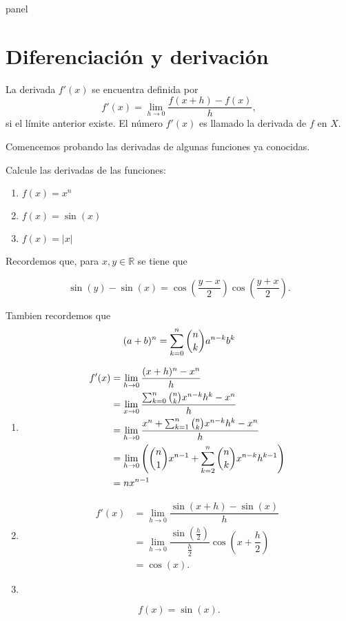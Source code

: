 panel\chapter*{Diferenciaci\'on y derivaci\'on}


\begin{definition}
	La derivada \(f'(x)\) se encuentra definida por
	\[
	f'(x)=\lim\limits_{h\to 0}\dfrac{f(x+h)-f(x)}{h},
	\]
	si el l\'imite anterior existe. El n\'umero \(f'(x)\) es llamado la derivada de \(f\) en \(X.\)
\end{definition}


Comencemos probando las derivadas de algunas funciones ya conocidas.\newline

\begin{exercise}
	Calcule las derivadas de las funciones:
	
	\begin{enumerate}
		\item \(f(x)=x^n\)
		\item \(f(x)=\sin(x)\)
		\item \(f(x)=\left|x\right|\)
	\end{enumerate}
\end{exercise}

Recordemos que, para \(x,y\in\mathbb{R}\) se tiene que

\[
\sin(y)-\sin(x)=\cos\left(\dfrac{y-x}{2}\right)\cos\left(\dfrac{y+x}{2}\right).
\]

Tambien recordemos que
\[
(a+b)^n=\displaystyle\sumabinomio{a}{b}{k}{n}\]

\begin{example}
	\begin{enumerate}
		\item \begin{align*}
		f'(x)&=\lim\limits_{h\to 0}\dfrac{(x+h)^n-x^n}{h}\\
			&=\lim\limits_{x\to 0}\dfrac{\sumabinomio{x}{h}{k}{n}-x^n}{h}\\
			&=\lim\limits_{h\to 0}\dfrac{x^n+\sum_{k=1}^{n}\binom{n}{k}x^{n-k}h^{k}-x^n}{h}\\
			&=\lim\limits_{h\to 0}\left(\binom{n}{1}x^{n-1}+\sum_{k=2}^{n}\binom{n}{k}x^{n-k}h^{k-1}	\right)\\
			&=nx^{n-1}
		\end{align*}
		
		
		\item \begin{align*}
		f'(x)&=\lim\limits_{h\to 0}\dfrac{\sin(x+h)-\sin(x)}{h}\\
		&=\lim\limits_{h\to 0}\dfrac{\sin\left(\frac{h}{2}\right)}{\frac{h}{2}}\cos\left(x+\dfrac{h}{2}\right)\\
		&=\cos(x).
		\end{align*}
		
		\item 
	\end{enumerate}
	\[
	f(x)=\sin(x).
	\]
	
	
\end{example}